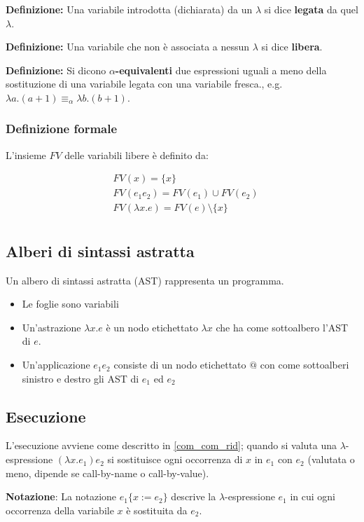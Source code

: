 \documentclass[a4paper,10pt]{article}
\begin{document}
\textbf{Definizione:} Una variabile introdotta (dichiarata) da un $\lambda$ si dice \textbf{legata} da quel $\lambda$.\bigskip

\textbf{Definizione:} Una variabile che non è associata a nessun $\lambda$ si dice \textbf{libera}.\bigskip

\textbf{Definizione:} Si dicono \textbf{$\alpha$-equivalenti} due espressioni uguali a meno della sostituzione di una variabile legata con una variabile fresca., e.g.  $\lambda a.(a+1) \equiv_\alpha \lambda b . (b+1)$.\bigskip

\subsubsection{Definizione formale}

L'insieme $FV$ delle variabili libere è definito da:

\[\begin{aligned}
   &FV(x) = \{x\}\\
&FV(e_1 e_2) = FV(e_1) \cup FV(e_2)\\
&FV(\lambda x.e) = FV(e) \setminus \{x\}\\
  \end{aligned}
\]

\subsection{Alberi di sintassi astratta}
 Un albero di sintassi astratta (AST) rappresenta un programma.
 \begin{itemize}
  \item Le foglie sono variabili
  \item Un'astrazione $\lambda x.e$ è un nodo etichettato $\lambda x$ che ha come sottoalbero l'AST di $e$.
  \item Un'applicazione $e_1 e_2$ consiste di un nodo etichettato $@$ con come sottoalberi sinistro e destro gli AST di $e_1$ ed $e_2$
 \end{itemize}

 \subsection{Esecuzione}
 L'esecuzione avviene come descritto in \ref{com_com_rid}; quando si valuta una $\lambda$-espressione $ (\lambda x.e_1)e_2 $ si sostituisce ogni occorrenza di $x$ in $e_1$ con $e_2$ (valutata o meno, dipende se call-by-name o call-by-value).\bigskip
 
 \textbf{Notazione}: La notazione $e_1 \{ x:=e_2 \}$ descrive la $\lambda$-espressione $e_1$ in cui ogni occorrenza della variabile $x$ è sostituita da $e_2$.\bigskip
 
\end{document}
